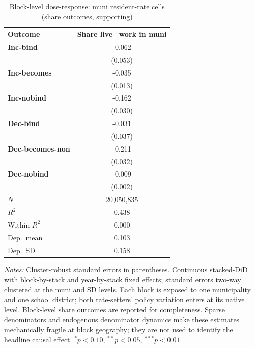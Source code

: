 \begin{table}[!htbp]
  \centering
  \caption{Block-level dose-response: muni resident-rate cells (share outcomes, supporting)}
  \label{tab:headline_block_muni_shares}
  \footnotesize
  \renewcommand{\arraystretch}{0.9}
  \begin{tabular}{lc}
    \toprule
    Outcome & Share live+work in muni \\
    \midrule
    \textbf{Inc-bind} & -0.062 \\
                      & (0.053) \\
    \textbf{Inc-becomes} & -0.035\sym{***} \\
                      & (0.013) \\
    \textbf{Inc-nobind} & -0.162\sym{***} \\
                      & (0.030) \\
    \textbf{Dec-bind} & -0.031 \\
                      & (0.037) \\
    \textbf{Dec-becomes-non} & -0.211\sym{***} \\
                      & (0.032) \\
    \textbf{Dec-nobind} & -0.009\sym{***} \\
                      & (0.002) \\
    \midrule
    $N$ & 20,050,835 \\
    $R^2$ & 0.438 \\
    Within $R^2$ & 0.000 \\
    Dep.\ mean & 0.103 \\
    Dep.\ SD & 0.158 \\
    \bottomrule
  \end{tabular}
  \vspace{0.3em}
  \begin{minipage}{0.95\textwidth}
    \footnotesize \textit{Notes:} Cluster-robust standard errors in parentheses. Continuous stacked-DiD with block-by-stack and year-by-stack fixed effects; standard errors two-way clustered at the muni and SD levels. Each block is exposed to one municipality and one school district; both rate-setters' policy variation enters at its native level. Block-level share outcomes are reported for completeness. Sparse denominators and endogenous denominator dynamics make these estimates mechanically fragile at block geography; they are not used to identify the headline causal effect. $^{*}p<0.10$, $^{**}p<0.05$, $^{***}p<0.01$.
  \end{minipage}
\end{table}
